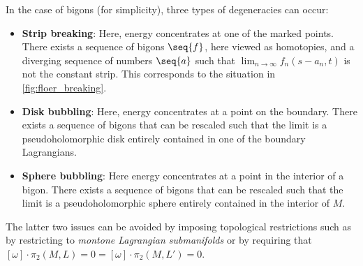 \begin{property}
        In the case of bigons (for simplicity), three types of degeneracies can occur:
        \begin{itemize}
            \item\textbf{Strip breaking}: Here, energy concentrates at one of the marked points. There exists a sequence of bigons $\seq{f}$, here viewed as homotopies, and a diverging sequence of numbers $\seq{a}$ such that
            $\lim_{n\rightarrow\infty}f_n(s-a_n,t)$ is not the constant strip. This corresponds to the situation in \cref{fig:floer_breaking}.
            \item\textbf{Disk bubbling}: Here, energy concentrates at a point on the boundary. There exists a sequence of bigons that can be rescaled such that the limit is a pseudoholomorphic disk entirely contained in one of the boundary Lagrangians.
            \item\textbf{Sphere bubbling}: Here energy concentrates at a point in the interior of a bigon. There exists a sequence of bigons that can be rescaled such that the limit is a pseudoholomorphic sphere entirely contained in the interior of $M$.
        \end{itemize}
        The latter two issues can be avoided by imposing topological restrictions such as by restricting to \textit{montone Lagrangian submanifolds} or by requiring that $[\omega]\cdot\pi_2(M,L)=0=[\omega]\cdot\pi_2(M,L')=0$.
    \end{property}


